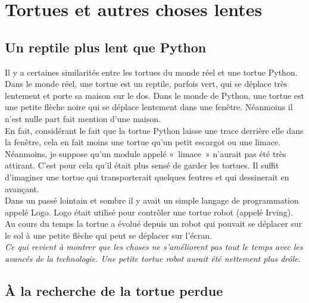 


\chapter{Tortues et autres choses lentes\label{chap:tortue1}}
\section{Un reptile plus lent que Python}
Il y a certaines similarités entre les tortues du monde réel et une tortue Python.
Dans le monde réel, une tortue   est un reptile, parfois vert, qui se déplace très lentement et porte sa maison sur le dos. Dans le monde de Python, une tortue est une petite flèche noire qui se déplace lentement dans une fenêtre. Néanmoins il n'est nulle part fait mention d'une maison.\\

En fait, considérant le fait que la tortue Python laisse une trace derrière elle dans la fenêtre, cela en fait moins une tortue qu'un petit escargot ou une limace. Néanmoins, je suppose qu'un module appelé «~limace~»  n'aurait pas été très attirant. C'est pour cela qu'il était plus sensé de garder les tortues. Il suffit d'imaginer une tortue qui transporterait quelques feutres et qui dessinerait en avançant.\\

Dans un passé lointain et sombre il y avait un simple langage de programmation appelé Logo. Logo était utilisé pour contrôler une tortue robot (appelé Irving). Au cours du temps la tortue a évolué depuis un robot qui pouvait se déplacer sur le sol à une petite flèche qui peut se déplacer sur l'écran.\\

\emph{Ce qui revient à montrer que les choses ne s'améliorent pas tout le temps avec les avancés de la technologie. Une petite tortue robot aurait été nettement plus drôle.}\\

\section{À la recherche de la tortue perdue}

